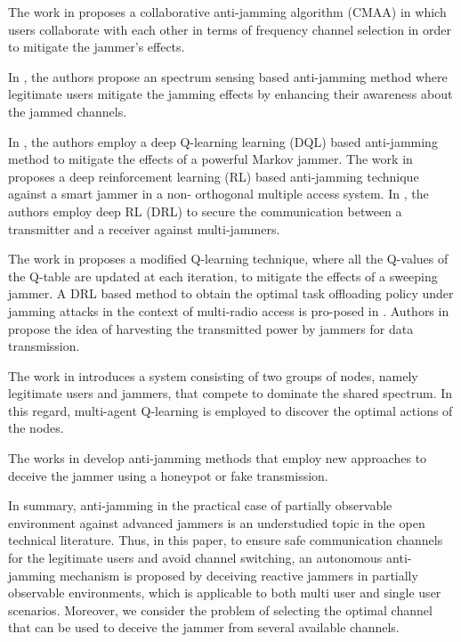 \documentclass[letterpaper%
, twoside%
, 12pt%
,thesepararticles%
, english%
,creativecommons,hyperref, withAlgo2e%
]{thETS}
\begin{document}
The work in \cite{8664589} proposes a collaborative anti-jamming algorithm (CMAA) in which users collaborate with each other in terms of frequency channel selection in order to mitigate the jammer's effects. 

In \cite{9149223}, the authors propose an spectrum sensing based anti-jamming method where legitimate users mitigate the jamming effects by enhancing their awareness about the jammed channels.

In \cite{8761848}, the authors employ a deep Q-learning learning (DQL) based anti-jamming method to mitigate the effects of a powerful Markov jammer. The work in \cite{Xiao2018ReinforcementLN} proposes a deep reinforcement learning (RL) based anti-jamming technique against a smart jammer in a non- orthogonal multiple access system. In \cite{8314744}, the authors employ deep RL (DRL) to secure the communication between a transmitter and a receiver against multi-jammers. 


The work in \cite{Slimeni2018AMQ} proposes a modified Q-learning technique, where all the Q-values of the Q-table are updated at each iteration, to mitigate the effects of a sweeping jammer. A DRL based method to obtain the optimal task offloading policy under jamming attacks in the context of multi-radio access is pro-posed in \cite{9136780}. Authors in \cite{8792369} propose the idea of harvesting the transmitted power by jammers for data transmission. 

The work \cite{7473910} in introduces a system consisting of two groups of nodes, namely legitimate users and jammers, that compete to dominate the shared spectrum. In this regard, multi-agent Q-learning is employed to discover the optimal actions of the nodes. 

The works in \cite{8371277} develop anti-jamming methods that employ new approaches to deceive the jammer using a honeypot or fake transmission. 

In summary, anti-jamming in the practical case of partially observable environment against advanced jammers is an understudied topic in the open technical literature. Thus, in this paper, to ensure safe communication channels for the legitimate users and avoid channel switching, an autonomous anti-jamming mechanism is proposed by deceiving reactive jammers in partially observable environments, which is applicable to both multi user and single user scenarios. Moreover, we consider the problem of selecting the optimal channel that can be used to deceive the jammer from several available channels.
\end{document}
